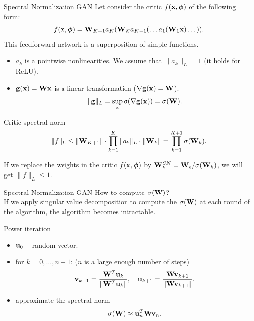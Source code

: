 \begin{frame}{Spectral Normalization GAN}
	Let consider the critic $f(\mathbf{x}, \boldsymbol{\phi})$ of the following form:
	\[
		f(\mathbf{x}, \boldsymbol{\phi}) = \mathbf{W}_{K+1} a_K (\mathbf{W}_K a_{K-1}(\dots a_1(\mathbf{W}_1 \mathbf{x}) \dots)).
	\]
	This feedforward network is a superposition of simple functions.
	\begin{itemize}
		\item $a_k$ is a pointwise nonlinearities. We assume that $\| a_k \|_L = 1$ (it holds for ReLU).
		\item $\mathbf{g}(\mathbf{x}) = \mathbf{W} \mathbf{x}$ is a linear transformation ($\nabla \mathbf{g}(\mathbf{x}) = \mathbf{W}$).
		\[
			\| \mathbf{g} \|_L = \sup_{\mathbf{x}} \sigma( \nabla \mathbf{g}(\mathbf{x})) = \sigma(\mathbf{W}).
		\]
	\end{itemize}
	\vspace{-0.3cm}
	\begin{block}{Critic spectral norm}
		\vspace{-0.3cm}
		\[
			\| f \|_L \leq \| \mathbf{W}_{K+1}\| \cdot \prod_{k=1}^K  \| a_k \|_L \cdot \| \mathbf{W}_k \| = \prod_{k=1}^{K+1} \sigma(\mathbf{W}_k).
		\]
		\vspace{-0.2cm}
	\end{block}
	If we replace the weights in the critic $f(\mathbf{x}, \boldsymbol{\phi})$ by $\mathbf{W}^{SN}_k = \mathbf{W}_k / \sigma(\mathbf{W}_k)$, we will get $\| f\|_L \leq 1.$ \\
	
\end{frame}
\begin{frame}{Spectral Normalization GAN}
	How to compute $\sigma(\mathbf{W})$? \\
	 If we apply singular value decomposition to compute the $\sigma(\mathbf{W})$ at each round of the algorithm, the algorithm becomes intractable.
	 
	 \begin{block}{Power iteration}
	 	\begin{itemize}
	 		\item $\mathbf{u}_0$ -- random vector.
	 		\item for $k = 0, \dots, n - 1$: ($n$ is a large enough number of steps)
	 		\[
	 			\mathbf{v}_{k+1} = \frac{\mathbf{W}^T \mathbf{u}_{k}}{\| \mathbf{W}^T \mathbf{u}_{k} \|}, \quad \mathbf{u}_{k+1} = \frac{\mathbf{W} \mathbf{v}_{k+1}}{\| \mathbf{W} \mathbf{v}_{k+1} \|}.
	 		\]
	 		\item approximate the spectral norm
	 		\[
	 			\sigma(\mathbf{W}) \approx \mathbf{u}_{n}^T \mathbf{W} \mathbf{v}_{n}.
	 		\]
	 	\end{itemize}
	 \end{block}

\end{frame}
